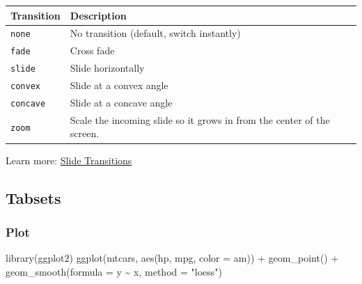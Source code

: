 \documentclass[
  letterpaper,
  DIV=11,
  numbers=noendperiod]{scrartcl}
\newenvironment{Shaded}{\begin{snugshade}}{\end{snugshade}}
\newcommand{\AttributeTok}[1]{\textcolor[rgb]{0.40,0.45,0.13}{#1}}
\newcommand{\FunctionTok}[1]{\textcolor[rgb]{0.28,0.35,0.67}{#1}}
\newcommand{\NormalTok}[1]{\textcolor[rgb]{0.00,0.23,0.31}{#1}}
\newcommand{\SpecialCharTok}[1]{\textcolor[rgb]{0.37,0.37,0.37}{#1}}
\newcommand{\StringTok}[1]{\textcolor[rgb]{0.13,0.47,0.30}{#1}}
\begin{document}
\begin{longtable}[]{@{}
  >{\raggedright\arraybackslash}p{}
  >{\raggedright\arraybackslash}p{}@{}}
\toprule\noalign{}
\begin{minipage}[b]{\linewidth}\raggedright
Transition
\end{minipage} & \begin{minipage}[b]{\linewidth}\raggedright
Description
\end{minipage} \\
\midrule\noalign{}
\endhead
\bottomrule\noalign{}
\endlastfoot
\texttt{none} & No transition (default, switch instantly) \\
\texttt{fade} & Cross fade \\
\texttt{slide} & Slide horizontally \\
\texttt{convex} & Slide at a convex angle \\
\texttt{concave} & Slide at a concave angle \\
\texttt{zoom} & Scale the incoming slide so it grows in from the center
of the screen. \\
\end{longtable}

Learn more:
\href{https://?meta:prerelease-subdomainquarto.org/docs/presentations/revealjs/advanced.html\#slide-transitions}{Slide
Transitions}

\subsection{Tabsets}\label{tabsets}

\subsubsection{Plot}

\begin{Shaded}
\begin{Highlighting}[]
\FunctionTok{library}\NormalTok{(ggplot2)}
\FunctionTok{ggplot}\NormalTok{(mtcars, }\FunctionTok{aes}\NormalTok{(hp, mpg, }\AttributeTok{color =}\NormalTok{ am)) }\SpecialCharTok{+}
  \FunctionTok{geom\_point}\NormalTok{() }\SpecialCharTok{+}
  \FunctionTok{geom\_smooth}\NormalTok{(}\AttributeTok{formula =}\NormalTok{ y }\SpecialCharTok{\textasciitilde{}}\NormalTok{ x, }\AttributeTok{method =} \StringTok{"loess"}\NormalTok{)}
\end{Highlighting}
\end{Shaded}
\end{document}
